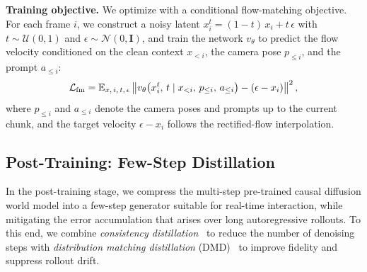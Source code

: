 \noindent\textbf{Training objective.}
We optimize {\method} with a conditional flow-matching objective. 
For each frame $i$, we construct a noisy latent $x_i^{t} = (1-t)\,x_i + t\,\epsilon$ with $t \sim \mathcal{U}(0,1)$ and $\epsilon \sim \mathcal{N}(0,\mathbf{I})$, and train the network $v_\theta$ to predict the flow velocity conditioned on the clean context $x_{<i}$, the camera pose $p_{\le i}$, and the prompt $a_{\le i}$:
\begin{equation}
\label{equ:pretrain_loss}
    \mathcal{L}_{\text{fm}} = \mathbb{E}_{x,\, i,\, t,\, \epsilon}
    \left\| v_\theta\!\left(x_i^{t},\, t \mid x_{<i},\, p_{\le i},\, a_{\le i}\right) - (\epsilon - x_i) \right\|^2,
\end{equation}
where $p_{\le i}$ and $a_{\le i}$ denote the camera poses and prompts up to the current chunk, and the target velocity $\epsilon - x_i$ follows the rectified-flow interpolation.

\subsection{Post-Training: Few-Step Distillation}
\label{sec:posttraining}
%
In the post-training stage, we compress the multi-step pre-trained causal diffusion world model into a few-step generator suitable for real-time interaction, while mitigating the error accumulation that arises over long autoregressive rollouts.
%
To this end, we combine \emph{consistency distillation}~\cite{song2023consistency} to reduce the number of denoising steps with \emph{distribution matching distillation} (DMD)~\cite{yin2024dmd} to improve fidelity and suppress rollout drift.


